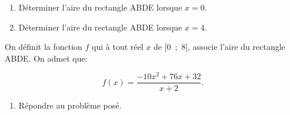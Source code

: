 \documentclass[10pt]{article}
\begin{document}
\medskip

\begin{enumerate}
\item Déterminer l'aire du rectangle ABDE lorsque $x = 0$.
\item Déterminer l'aire du rectangle ABDE lorsque $x =  4$.
\end{enumerate}

On définit la fonction $f$ qui à tout réel $x$ de [0~;~8], associe l'aire du rectangle ABDE. On admet que:

\[f(x) = \dfrac{-10x^2 + 76x + 32}{x + 2}.\]

\begin{enumerate}[resume]
\item Répondre au problème posé.
\end{enumerate}

\bigskip
\end{document}

